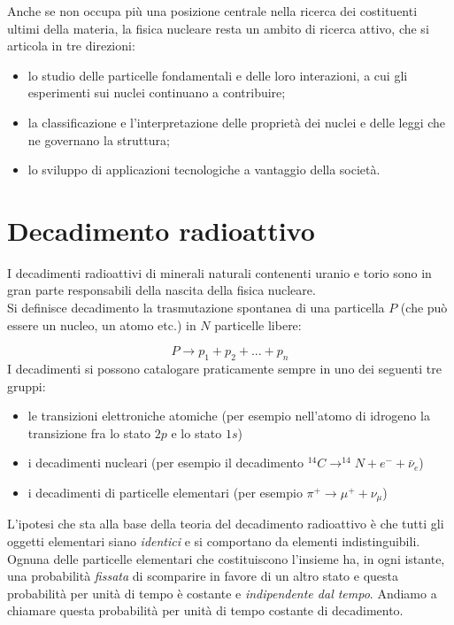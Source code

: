 Anche se non occupa più una posizione centrale nella ricerca dei costituenti ultimi della materia, la fisica nucleare resta un ambito di ricerca attivo, che si articola in tre direzioni:
\begin{itemize}
    \item lo studio delle particelle fondamentali e delle loro interazioni, a cui gli esperimenti sui nuclei continuano a contribuire;
    \item la classificazione e l'interpretazione delle proprietà dei nuclei e delle leggi che ne governano la struttura;
    \item lo sviluppo di applicazioni tecnologiche a vantaggio della società.
\end{itemize}
%
\section{Decadimento radioattivo}

I decadimenti radioattivi di minerali naturali contenenti uranio e torio sono in gran parte responsabili della nascita della fisica nucleare.\\

Si definisce decadimento la trasmutazione spontanea di una particella $P$ (che può essere un nucleo, un atomo etc.) in $N$ particelle libere:

\begin{equation*}
    P \to p_1 + p_2 + ... + p_n
\end{equation*}
I decadimenti si possono catalogare praticamente sempre in uno dei seguenti tre gruppi:

\begin{itemize}
    \item le transizioni elettroniche atomiche (per esempio nell’atomo di idrogeno la transizione fra lo stato $2p$ e lo stato $1s$)
    \item i decadimenti nucleari (per esempio il decadimento $^{14} C \to ^{14}N + e^- + \bar{\nu}_e$)
    \item i decadimenti di particelle elementari (per esempio $\pi^+ \to \mu^+ + \nu_{\mu}$)
\end{itemize}
L'ipotesi che sta alla base della teoria del decadimento radioattivo è che tutti gli oggetti elementari siano \emph{identici} e si comportano da elementi indistinguibili. \\
Ognuna delle particelle elementari che costituiscono l'insieme ha, in ogni istante, una probabilità \emph{fissata} di scomparire in favore di un altro stato e questa probabilità per unità di tempo è costante e \emph{indipendente dal tempo}. Andiamo a chiamare questa probabilità per unità di tempo costante di decadimento.\\


